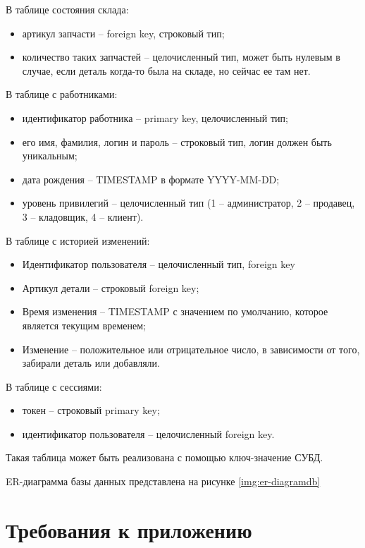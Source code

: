 В таблице состояния склада:
\begin{itemize}
	\item артикул запчасти -- foreign key, строковый тип;
	\item количество таких запчастей -- целочисленный тип, может быть нулевым в случае, если деталь когда-то была на складе, но сейчас ее там нет.
\end{itemize}

В таблице с работниками:
\begin{itemize}
	\item идентификатор работника -- primary key, целочисленный тип;
	\item его имя, фамилия, логин и пароль -- строковый тип, логин должен быть уникальным;
	\item дата рождения -- TIMESTAMP в формате YYYY-MM-DD;
	\item уровень привилегий -- целочисленный тип (1 -- администратор, 2 -- продавец, 3 -- кладовщик, 4 -- клиент). 
\end{itemize}

В таблице с историей изменений:
\begin{itemize}
	\item Идентификатор пользователя -- целочисленный тип, foreign key
	\item Артикул детали -- строковый foreign key;
	\item Время изменения -- TIMESTAMP с значением по умолчанию, которое является текущим временем;
	\item Изменение -- положительное или отрицательное число, в зависимости от того, забирали деталь или добавляли.
\end{itemize}

В таблице с сессиями:
\begin{itemize}
	\item токен -- строковый primary key;
	\item идентификатор пользователя -- целочисленный foreign key.
\end{itemize}

Такая таблица может быть реализована с помощью ключ-значение СУБД.

ER-диаграмма базы данных представлена на рисунке \ref{img:er-diagramdb}


\section{Требования к приложению}

